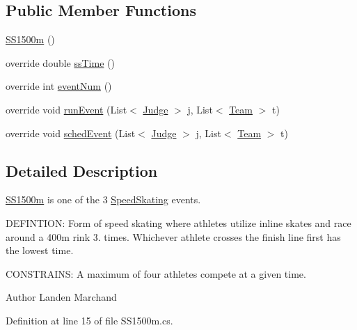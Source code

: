 \subsection*{Public Member Functions}
\begin{DoxyCompactItemize}
\item 
\hyperlink{classPCO_1_1SS1500m_abcd0ba6477a4d91d5d39031b0fb60d9e}{S\+S1500m} ()
\item 
override double \hyperlink{classPCO_1_1SS1500m_acd55a4c8b05bfe2acfebe0bb9bf58d26}{ss\+Time} ()
\item 
override int \hyperlink{classPCO_1_1SS1500m_ab027d041adf7b8dea0b3189948ceb5d1}{event\+Num} ()
\item 
override void \hyperlink{classPCO_1_1SS1500m_a2e52ec9781aedcfdf1a47d8a8f4560ff}{run\+Event} (List$<$ \hyperlink{classPCO_1_1Judge}{Judge} $>$ j, List$<$ \hyperlink{classPCO_1_1Team}{Team} $>$ t)
\item 
override void \hyperlink{classPCO_1_1SS1500m_aebbf1e9bd3d845f68339381daf22ef23}{sched\+Event} (List$<$ \hyperlink{classPCO_1_1Judge}{Judge} $>$ j, List$<$ \hyperlink{classPCO_1_1Team}{Team} $>$ t)
\end{DoxyCompactItemize}


\subsection{Detailed Description}
\hyperlink{classPCO_1_1SS1500m}{S\+S1500m} is one of the 3 \hyperlink{classPCO_1_1SpeedSkating}{Speed\+Skating} events. 

D\+E\+F\+I\+N\+T\+I\+O\+N\+: Form of speed skating where athletes utilize inline skates and race around a 400m rink 3. times. Whichever athlete crosses the finish line first has the lowest time.

C\+O\+N\+S\+T\+R\+A\+I\+N\+S\+: A maximum of four athletes compete at a given time.\begin{DoxyAuthor}{Author}
Landen Marchand 
\end{DoxyAuthor}


Definition at line 15 of file S\+S1500m.\+cs.



